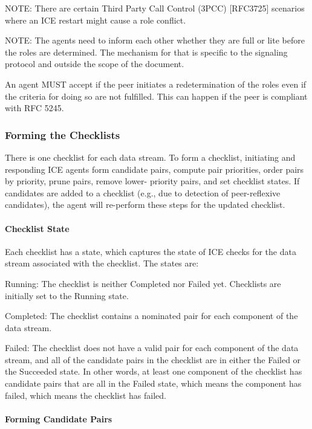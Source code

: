 \documentclass{article}
\begin{document}
NOTE: There are certain Third Party Call Control (3PCC) [RFC3725] scenarios where an ICE restart might cause a role conflict.

NOTE: The agents need to inform each other whether they are full or lite before the roles are determined.  The mechanism for that is specific to the signaling protocol and outside the scope of the document.

An agent MUST accept if the peer initiates a redetermination of the roles even if the criteria for doing so are not fulfilled.  This can happen if the peer is compliant with RFC 5245.

\subsubsection{Forming the Checklists}

There is one checklist for each data stream.  To form a checklist, initiating and responding ICE agents form candidate pairs, compute pair priorities, order pairs by priority, prune pairs, remove lower- priority pairs, and set checklist states.  If candidates are added to a checklist (e.g., due to detection of peer-reflexive candidates), the agent will re-perform these steps for the updated checklist.

\paragraph{Checklist State}

Each checklist has a state, which captures the state of ICE checks for the data stream associated with the checklist.  The states are:

Running:  The checklist is neither Completed nor Failed yet. Checklists are initially set to the Running state.

Completed:  The checklist contains a nominated pair for each component of the data stream.

Failed:  The checklist does not have a valid pair for each component of the data stream, and all of the candidate pairs in the checklist are in either the Failed or the Succeeded state.  In other words, at least one component of the checklist has candidate pairs that are all in the Failed state, which means the component has failed, which means the checklist has failed.

\paragraph{Forming Candidate Pairs}
\end{document}
